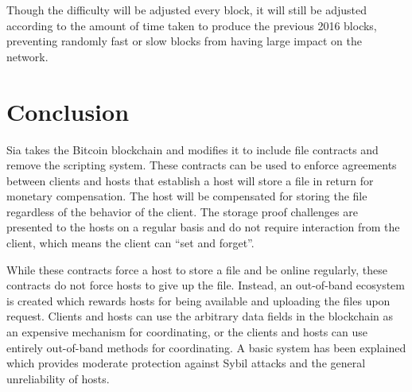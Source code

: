 \documentclass[twocolumn]{article}
\begin{document}
Though the difficulty will be adjusted every block, it will still be adjusted according to the amount of time taken to produce the previous 2016 blocks, preventing randomly fast or slow blocks from having large impact on the network.




\section{Conclusion}
Sia takes the Bitcoin blockchain and modifies it to include file contracts and remove the scripting system.
These contracts can be used to enforce agreements between clients and hosts that establish a host will store a file in return for monetary compensation.
The host will be compensated for storing the file regardless of the behavior of the client.
The storage proof challenges are presented to the hosts on a regular basis and do not require interaction from the client, which means the client can ``set and forget''.

While these contracts force a host to store a file and be online regularly, these contracts do not force hosts to give up the file.
Instead, an out-of-band ecosystem is created which rewards hosts for being available and uploading the files upon request.
Clients and hosts can use the arbitrary data fields in the blockchain as an expensive mechanism for coordinating, or the clients and hosts can use entirely out-of-band methods for coordinating.
A basic system has been explained which provides moderate protection against Sybil attacks and the general unreliability of hosts.
\end{document}
